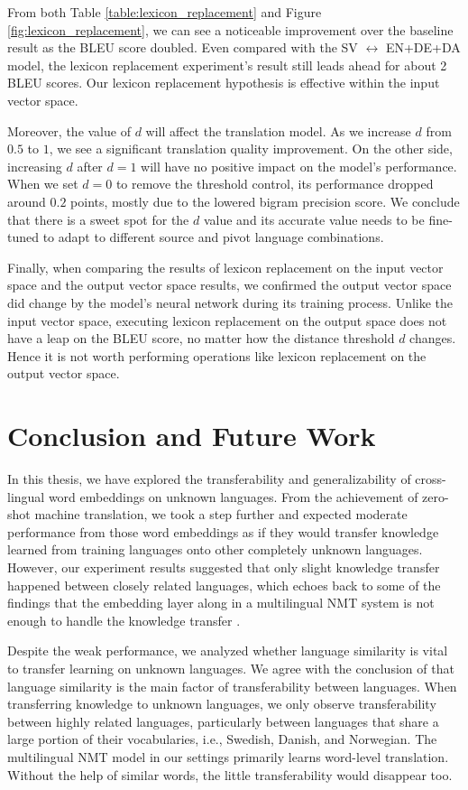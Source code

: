 \documentclass[thesis]{cluu}
\begin{document}
From both Table \ref{table:lexicon_replacement} and Figure \ref{fig:lexicon_replacement}, we can see a noticeable improvement over the baseline result as the BLEU score doubled. Even compared with the SV $\leftrightarrow$ EN+DE+DA model, the lexicon replacement experiment's result still leads ahead for about 2 BLEU scores. Our lexicon replacement hypothesis is effective within the input vector space.

Moreover, the value of $d$ will affect the translation model. As we increase $d$ from $0.5$ to $1$, we see a significant translation quality improvement. On the other side, increasing $d$ after $d=1$ will have no positive impact on the model's performance. When we set $d=0$ to remove the threshold control, its performance dropped around $0.2$ points, mostly due to the lowered bigram precision score. We conclude that there is a sweet spot for the $d$ value and its accurate value needs to be fine-tuned to adapt to different source and pivot language combinations.

Finally, when comparing the results of lexicon replacement on the input vector space and the output vector space results, we confirmed the output vector space did change by the model's neural network during its training process. Unlike the input vector space, executing lexicon replacement on the output space does not have a leap on the BLEU score, no matter how the distance threshold $d$ changes. Hence it is not worth performing operations like lexicon replacement on the output vector space.

\chapter{Conclusion and Future Work}
\label{chap:conclusion}

In this thesis, we have explored the transferability and generalizability of cross-lingual word embeddings on unknown languages. From the achievement of zero-shot machine translation, we took a step further and expected moderate performance from those word embeddings as if they would transfer knowledge learned from training languages onto other completely unknown languages. However, our experiment results suggested that only slight knowledge transfer happened between closely related languages, which echoes back to some of the findings that the embedding layer along in a multilingual NMT system is not enough to handle the knowledge transfer \parencite{aji-etal-2020-neural}.

Despite the weak performance, we analyzed whether language similarity is vital to transfer learning on unknown languages. We agree with the conclusion of \textcite{Qi:2018aa} that language similarity is the main factor of transferability between languages. When transferring knowledge to unknown languages, we only observe transferability between highly related languages, particularly between languages that share a large portion of their vocabularies, i.e., Swedish, Danish, and Norwegian. The multilingual NMT model in our settings primarily learns word-level translation. Without the help of similar words, the little transferability would disappear too.
\end{document}
